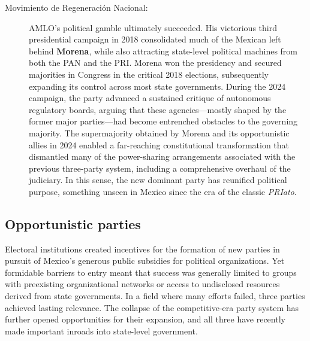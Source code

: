\documentclass[letter,12pt]{article}
\begin{document}
\begin{description}
\item[Movimiento de Regeneración Nacional:] AMLO's political gamble ultimately succeeded. His victorious third presidential campaign in 2018 consolidated much of the Mexican left behind \textbf{Morena}, while also attracting state-level political machines from both the PAN and the PRI. Morena won the presidency and secured majorities in Congress in the critical 2018 elections, subsequently expanding its control across most state governments. During the 2024 campaign, the party advanced a sustained critique of autonomous regulatory boards, arguing that these agencies---mostly shaped by the former major parties---had become entrenched obstacles to the governing majority. The supermajority obtained by Morena and its opportunistic allies in 2024 enabled a far-reaching constitutional transformation that dismantled many of the power-sharing arrangements associated with the previous three-party system, including a comprehensive overhaul of the judiciary. In this sense, the new dominant party has reunified political purpose, something unseen in Mexico since the era of the classic \emph{PRIato}.
  
\end{description}

\subsection{Opportunistic parties}

Electoral institutions created incentives for the formation of new parties in pursuit of Mexico's generous public subsidies for political organizations. Yet formidable barriers to entry meant that success was generally limited to groups with preexisting organizational networks or access to undisclosed resources derived from state governments. In a field where many efforts failed, three parties achieved lasting relevance. The collapse of the competitive-era party system has further opened opportunities for their expansion, and all three have recently made important inroads into state-level government.
\end{document}
